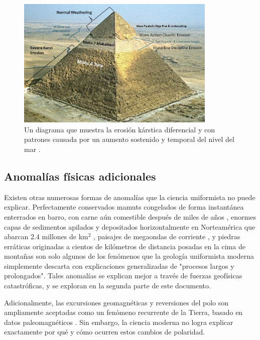 \documentclass[10pt,twocolumn,letterpaper]{article}
\begin{document}
\begin{figure}[t]
\begin{center}
\includegraphics[width=0.85\textwidth]{khafre.jpg}
\end{center}
   \caption{Un diagrama que muestra la erosión kárstica diferencial y con patrones causada por un aumento sostenido y temporal del nivel del mar \cite{27}.}
\label{fig:4}
\end{figure}

\subsection{Anomalías físicas adicionales}

Existen otras numerosas formas de anomalías que la ciencia uniformista no puede explicar. Perfectamente conservados mamuts congelados de forma instantánea enterrados en barro, con carne aún comestible después de miles de años \cite{17,18,19}, enormes capas de sedimentos apilados y depositados horizontalmente en Norteamérica que abarcan 2.4 millones de km$^2$ \cite{21}, paisajes de megaondas de corriente \cite{22}, y piedras erráticas originadas a cientos de kilómetros de distancia posadas en la cima de montañas \cite{23,26} son solo algunos de los fenómenos que la geología uniformista moderna simplemente descarta con explicaciones generalizadas de "procesos largos y prolongados". Tales anomalías se explican mejor a través de fuerzas geofísicas catastróficas, y se exploran en la segunda parte de este documento.

Adicionalmente, las excursiones geomagnéticas y reversiones del polo son ampliamente aceptadas como un fenómeno recurrente de la Tierra, basado en datos paleomagnéticos \cite{35,40,41}. Sin embargo, la ciencia moderna no logra explicar exactamente por qué y cómo ocurren estos cambios de polaridad.
\end{document}
